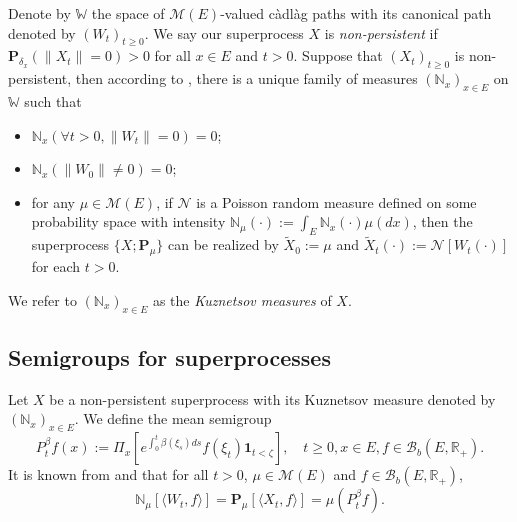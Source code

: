 \documentclass[UTF8]{pkuthss}
\theoremstyle{plain}
\theoremstyle{definition}
\numberwithin{equation}{section}
\begin{document}
\begin{comment}
    Notice that the branching mechanism $\psi$ can be extended into a map from $E \times \mathbb C_+$ to $\mathbb C$ using \eqref{eq: branching mechanism}.
    Define
\begin{equation}
    \psi'(x,z):= - \beta(x) + 2\alpha(x) z + \int_{(0,\infty)} (1-e^{-zy})y\pi(x,dy),
    \quad x\in E, z\in \mathbb C_+.
\end{equation}
    Then according to Lemma \ref{lem: extension lemma for branching mechanism}, for each $x \in E$, $z \mapsto \psi(x,z)$ is a holomorphic function on $\mathbb C_+^0$ with derivative $z \mapsto \psi'(x,z)$.
    Define $\psi_0(x,z) := \psi(x,z)+ \beta(x)z $ and $\psi'_0(x,z) := \psi'(x,z) + \beta(x)$.
\end{comment}

    Denote by $\mathbb W$ the space of $\mathcal M(E)$-valued c\`{a}dl\`{a}g paths with its canonical path denoted by $(W_t)_{t\geq 0}$.
    We say our superprocess $X$ is \emph{non-persistent} if $\mathbf P_{\delta_x}(\|X_t\|= 0) > 0$ for all $x\in E$ and $t> 0$.
    Suppose that $(X_t)_{t\geq 0}$ is non-persistent, then according to \cite[Section 8.4]{Li2011Measure-valued}, there is a unique family of measures $(\mathbb N_x)_{x\in E}$ on $\mathbb W$ such that
\begin{itemize}
\item
    $\mathbb N_x (\forall t > 0, \|W_t\|=0) =0$;
\item
    $\mathbb N_x(\|W_0 \|\neq 0) = 0$;
\item
    for any $\mu \in \mathcal M(E)$, if $\mathcal N$ is a Poisson random measure defined on some probability space
    with intensity $\mathbb N_\mu(\cdot):= \int_E \mathbb N_x(\cdot )\mu(dx)$,
    then the superprocess $\{X;\mathbf P_\mu\}$ can be realized by $\widetilde X_0 := \mu$ and $\widetilde X_t(\cdot) := \mathcal N[W_t(\cdot)]$ for each $t>0$.
\end{itemize}
    We refer to $(\mathbb N_x)_{x\in E}$ as the \emph{Kuznetsov measures} of $X$.
\subsection{{Semigroups for superprocesses}}
\label{sec: definition of vf}
    Let $X$ be a non-persistent superprocess with its Kuznetsov measure denoted by $(\mathbb N_x)_{x\in E}$.
    We define the mean semigroup
\begin{equation}
    P_t^{\beta} f(x)
    := \Pi_{x}[e^{\int_0^t \beta(\xi_s)ds}f(\xi_t) \mathbf 1_{t< \zeta}],
    \quad t\geq 0, x\in E, f\in \mathcal B_b(E,\mathbb R_+).
\end{equation}
    It is known from \cite[Proposition 2.27]{Li2011Measure-valued} and \cite[Theorem 2.7]{Kyprianou2014Fluctuations} that for all $t > 0$, $\mu \in \mathcal M(E)$ and $f\in \mathcal B_b(E,\mathbb R_+)$,
\begin{equation}
\label{eq: mean formula for superprocesses}
   \mathbb N_{\mu}[\langle W_t, f\rangle]    
   =\mathbf P_{\mu}[\langle X_t, f\rangle]
   =\mu(P^{\beta}_t f).
\end{equation}
\end{document}
